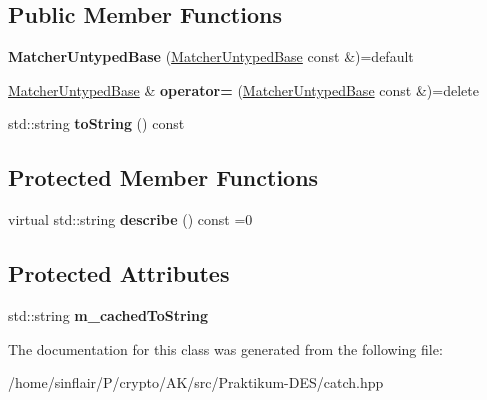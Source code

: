 \subsection*{Public Member Functions}
\begin{DoxyCompactItemize}
\item 
\mbox{\label{classCatch_1_1Matchers_1_1Impl_1_1MatcherUntypedBase_a985fd3c3ffcc9f2e8dc7a330130040b0}} 
{\bfseries Matcher\+Untyped\+Base} (\hyperlink{classCatch_1_1Matchers_1_1Impl_1_1MatcherUntypedBase}{Matcher\+Untyped\+Base} const \&)=default
\item 
\mbox{\label{classCatch_1_1Matchers_1_1Impl_1_1MatcherUntypedBase_a62668ccc47b64a9094dcb6413f9af80b}} 
\hyperlink{classCatch_1_1Matchers_1_1Impl_1_1MatcherUntypedBase}{Matcher\+Untyped\+Base} \& {\bfseries operator=} (\hyperlink{classCatch_1_1Matchers_1_1Impl_1_1MatcherUntypedBase}{Matcher\+Untyped\+Base} const \&)=delete
\item 
\mbox{\label{classCatch_1_1Matchers_1_1Impl_1_1MatcherUntypedBase_a5982c7c80ca71dfe2298babadad7a453}} 
std\+::string {\bfseries to\+String} () const
\end{DoxyCompactItemize}
\subsection*{Protected Member Functions}
\begin{DoxyCompactItemize}
\item 
\mbox{\label{classCatch_1_1Matchers_1_1Impl_1_1MatcherUntypedBase_a91d3a907dbfcbb596077df24f6e11fe2}} 
virtual std\+::string {\bfseries describe} () const =0
\end{DoxyCompactItemize}
\subsection*{Protected Attributes}
\begin{DoxyCompactItemize}
\item 
\mbox{\label{classCatch_1_1Matchers_1_1Impl_1_1MatcherUntypedBase_a951095c462657e7097a9a6dc4dde813f}} 
std\+::string {\bfseries m\+\_\+cached\+To\+String}
\end{DoxyCompactItemize}


The documentation for this class was generated from the following file\+:\begin{DoxyCompactItemize}
\item 
/home/sinflair/\+P/crypto/\+A\+K/src/\+Praktikum-\/\+D\+E\+S/catch.\+hpp\end{DoxyCompactItemize}
